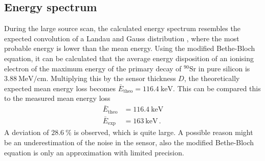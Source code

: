 \subsection{Energy spectrum}

During the large source scan, the calculated energy spectrum resembles the expected convolution of a
Landau and Gauss distribution \cite{V15}, where the most probable energy is lower than the mean energy.
Using the modified Bethe-Bloch equation, it can be calculated that the average energy disposition 
of an ionising electron of the maximum energy of the primary decay of $^{90}\text{Sr}$ in pure silicon is
$\qty{3.88}{\mega\electronvolt\per\centi\meter}$.
Multiplying this by the sensor thickness $D$, the theoretically expected mean energy loss becomes
$\bar{E}_{\text{theo}} = \qty{116.4}{\kilo\electronvolt}$. This can be compared this to the measured
mean energy loss
\begin{align*}
    \bar{E}_{\text{theo}} &= \qty{116.4}{\kilo\electronvolt} \\
    \bar{E}_{\text{exp}} &= \qty{163}{\kilo\electronvolt}\, .
\end{align*}
A deviation of $\qty{28.6}{\percent}$ is observed, which is quite large. A possible reason might be an underestimation
of the noise in the sensor, also the modified Bethe-Bloch equation is only an approximation with limited
precision.